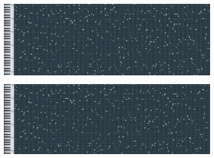 \documentclass[conference]{IEEEtran}
\begin{document}
\begin{figure}
\centering
\begin{minipage}{.5\textwidth}
  \centering
  \includegraphics[width=.9\linewidth]{fitness3-first-full.png}
  \label{fig:test1}
\end{minipage}%
\begin{minipage}{.5\textwidth}
  \centering
  \includegraphics[width=.9\linewidth]{fitness3-final-full.png}
  \label{fig:test2}
\end{minipage}


\end{figure}
\end{document}
